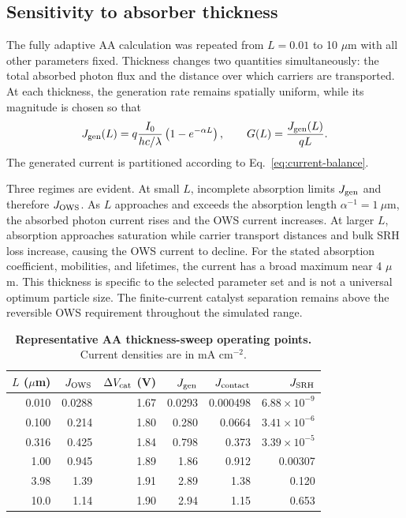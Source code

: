 \documentclass[11pt]{article}
\begin{document}
\subsection{Sensitivity to absorber thickness}
\label{sec:thickness}

The fully adaptive AA calculation was repeated from $L=0.01$ to 10 $\mu$m with all other parameters fixed. Thickness changes two quantities simultaneously: the total absorbed photon flux and the distance over which carriers are transported. At each thickness, the generation rate remains spatially uniform, while its magnitude is chosen so that
\begin{equation}
J_{\rm gen}(L)=q\frac{I_0}{hc/\lambda}\left(1-e^{-\alpha L}\right),
\qquad
G(L)=\frac{J_{\rm gen}(L)}{qL}.
\label{eq:thickness-generation}
\end{equation}
The generated current is partitioned according to Eq.~\ref{eq:current-balance}.


Three regimes are evident. At small $L$, incomplete absorption limits $J_{\rm gen}$ and therefore $J_{\rm OWS}$. As $L$ approaches and exceeds the absorption length $\alpha^{-1}=1~\mu$m, the absorbed photon current rises and the OWS current increases. At larger $L$, absorption approaches saturation while carrier transport distances and bulk SRH loss increase, causing the OWS current to decline. For the stated absorption coefficient, mobilities, and lifetimes, the current has a broad maximum near 4 $\mu$m. This thickness is specific to the selected parameter set and is not a universal optimum particle size. The finite-current catalyst separation remains above the reversible OWS requirement throughout the simulated range.

\begin{table}[ht]
\centering
\caption{\textbf{Representative AA thickness-sweep operating points.} Current densities are in mA cm$^{-2}$.}
\label{tab:thickness}
\scriptsize
\begin{tabular}{@{}rrrrrr@{}}
\toprule
$L$ ($\mu$m) & $J_{\rm OWS}$ & $\Delta V_{\rm cat}$ (V) & $J_{\rm gen}$ & $J_{\rm contact}$ & $J_{\rm SRH}$ \\
\midrule
0.010 & 0.0288 & 1.67 & 0.0293 & 0.000498 & $6.88\times10^{-9}$ \\
0.100 & 0.214 & 1.80 & 0.280 & 0.0664 & $3.41\times10^{-6}$ \\
0.316 & 0.425 & 1.84 & 0.798 & 0.373 & $3.39\times10^{-5}$ \\
1.00 & 0.945 & 1.89 & 1.86 & 0.912 & 0.00307 \\
3.98 & 1.39 & 1.91 & 2.89 & 1.38 & 0.120 \\
10.0 & 1.14 & 1.90 & 2.94 & 1.15 & 0.653 \\
\bottomrule
\end{tabular}
\end{table}
\end{document}
